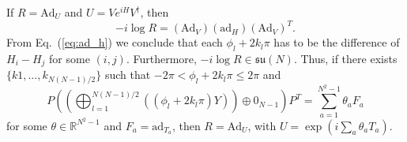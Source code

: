 \documentclass{article}
\begin{document}
If $R = \text{Ad}_U$ and $U = Ve^{iH}V^\dagger$, then
\begin{equation}
  -i\log R = (\text{Ad}_V)(\text{ad}_H)(\text{Ad}_V)^T.
\end{equation}
From Eq.~(\ref{eq:ad_h}) we conclude that each $\phi_l+2k_l\pi$ has to be
the difference of $H_i-H_j$ for some $(i,j)$.  Furthermore,
$-i\log R\in \mathfrak{su}(N)$.  Thus, if there exists
$\{k1,\ldots,k_{N(N-1)/2}\}$ such that $-2\pi <\phi_l+2k_l\pi\le2\pi$ and
\begin{equation}
  P\left(\left(\bigoplus_{l=1}^{N(N-1)/2}((\phi_l+2k_l\pi)Y)\right)
  \oplus0_{N-1}\right)P^T = \sum_{a=1}^{N^2-1}\theta_aF_a
\end{equation}
for some $\theta\in\mathbb R^{N^2-1}$ and $F_a = \text{ad}_{T_a}$, then
$R = \text{Ad}_U$, with $U = \exp(i\sum_a\theta_aT_a)$.



\end{document}
